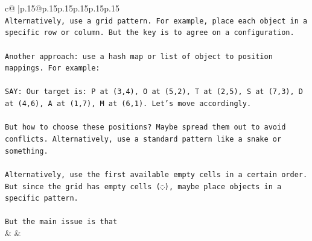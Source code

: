 \documentclass{article}
\begin{document}
{\begin{supertabular}{c@{$\;$}|p{.15\linewidth}@{}p{.15\linewidth}p{.15\linewidth}p{.15\linewidth}p{.15\linewidth}p{.15\linewidth}}
{{{\\ 
\texttt{Alternatively, use a grid pattern. For example, place each object in a specific row or column. But the key is to agree on a configuration.} \\
\\ 
\texttt{Another approach: use a hash map or list of object to position mappings. For example:} \\
\\ 
\texttt{SAY: Our target is: P at (3,4), O at (5,2), T at (2,5), S at (7,3), D at (4,6), A at (1,7), M at (6,1). Let's move accordingly.} \\
\\ 
\texttt{But how to choose these positions? Maybe spread them out to avoid conflicts. Alternatively, use a standard pattern like a snake or something.} \\
\\ 
\texttt{Alternatively, use the first available empty cells in a certain order. But since the grid has empty cells (◌), maybe place objects in a specific pattern.} \\
\\ 
\texttt{But the main issue is that} \\
            }
        }
    }
    & & \\ \\


\end{supertabular}}
\end{document}
